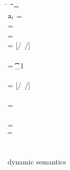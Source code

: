 \documentclass{tex/llncs}
\begin{document}
%
\begin{figure}[!h]
\noindent\hrulefill


\medskip
\small

\begin{minipage}{\textwidth}
\small        
\begin{tabbing}
  \K\HS \New{} \HS\= \s~ \HS \=\Red\HS \= \K \HS\= \ap \HS\= \sp\HS \= \WHERE\HS\= \fresh\ap \HS\HS\HS\HS\HS\HS\HS\=  \sp = {\Map{}}
\\
\K\HS \FReadR\a{\f[i]} \> \s           \>\Red\>     \K \>$\a[i]$ \> \s  \> \WHERE \>\App\s\a=\obj{}
\\
\K\HS {\FWriteR\a{\f[i]}\ap} \> \s     \>\Red\>     \K \> \ap \> \sp \>  \WHERE \>\App\s\a=\obj{} \HS  \\ \> \> \> \> \> \> \> \sp = \Map{}
\\
\K\HS{\KCall\a\m\ap\t\tp} \> \s      \>\Red\>     \K \>  \ep \> \s \> \WHERE\> \ep = {[\a/\this~{\ap/\x}]\e} \HS \\ \> \> \> \> \> \> \> \Mdef\m{}\e\In \App\K\C  \\ \> \> \> \> \> \> \>  \App\s\a=\obj{} \> \StrSub {\emptyset}\K\t {\t_{1}} \\ 
\> \> \> \> \> \> \> \StrSub {\emptyset} \tp
\\
 \K\HS {\DynCall\a\m\ap}\> \s        \>\Red\>    \K \> \ep \> \s \>  \WHERE\> \ep = {[\a/\this~{\ap/\x}]\e}\HS \\ \> \> \> \> \> \> \> \Mdef\m\x\any\any\e \In \App\K\C \\ \> \> \> \> \> \> \> \App\s\a=\obj{} 
\\
 \K\HS {\SubCast \any\a} \> \s       \>\Red\>   \K \> \a \> \s
\\
 \K\HS {\SubCast \D\a} \> \s        \>\Red\>    \K \> \a \> \s \>  \WHERE\> \StrSub {\emptyset}\K\C \D \>\App\s\a=\obj{} 
\\
 \K\HS {\BehCast \t\a} \> \s         \>\Red\>   \Kp \> \ap \> \sp \> \WHERE\> \behcast \a\t\s\K \Kp\ap\sp    
\\
\K \HS \EM{\EE[\e]} \> \s            \>\Red\>   \Kp \> \EM{\EE[\ep]} \> \sp \> \WHERE \> \K~\e~\s \Red~\Kp~\ep~\sp
\end{tabbing}
\end{minipage}

\medskip

\hrulefill
\caption{\kafka dynamic semantics}\label{fig:semantics}
\end{figure}
\end{document}
